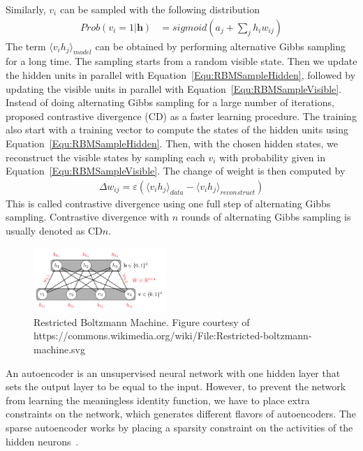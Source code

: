 Similarly, $v_i$ can be sampled with the following distribution
\begin{align}
    Prob(v_i = 1 | \mathbf{h}) &= sigmoid(a_j + \sum_j{h_i w_{ij}})
    \label{Equ:RBMSampleVisible}
\end{align}
The term $\langle v_i h_j \rangle_{model}$ can be obtained by performing alternative Gibbs
sampling for a long time.
The sampling starts from a random visible state.
Then we update the hidden units in parallel with Equation~\ref{Equ:RBMSampleHidden},
followed by updating the visible units in parallel with Equation~\ref{Equ:RBMSampleVisible}.
Instead of doing alternating Gibbs sampling for a large number of iterations,
\cite{TrainCD} proposed contrastive divergence (CD) as a faster learning procedure.
The training also start with a training vector to compute the states of the hidden units
using Equation~\ref{Equ:RBMSampleHidden}.
Then, with the chosen hidden states, we reconstruct the visible states by sampling each $v_i$
with probability given in Equation~\ref{Equ:RBMSampleVisible}.
The change of weight is then computed by
\begin{align}
    \Delta w_{ij} = \varepsilon (\langle v_i h_j \rangle_{data} -
    \langle v_i h_j \rangle_{reconstruct})
    \label{Equ:RBMCD1}
\end{align}
This is called contrastive divergence using one full step of alternating Gibbs sampling.
Contrastive divergence with $n$ rounds of alternating Gibbs sampling
is usually denoted as CD$n$.

\begin{figure}[h]
    \centering
    \includegraphics[width=0.45\textwidth]{figures/rbm.png}
    \caption{Restricted Boltzmann Machine.
        Figure courtesy of https://commons.wikimedia.org/wiki/File:Restricted-boltzmann-machine.svg}
    \label{Fig:RBMArchitecture}
\end{figure}

\fi

An autoencoder is an unsupervised neural network with one hidden layer that sets the output layer to be equal to the input.
However, to prevent the network from learning the meaningless identity function, we have to place extra constraints on the network,
which generates different flavors of autoencoders.
The sparse autoencoder works by placing a sparsity constraint on the activities of the hidden neurons~\cite{SparseAE}.

